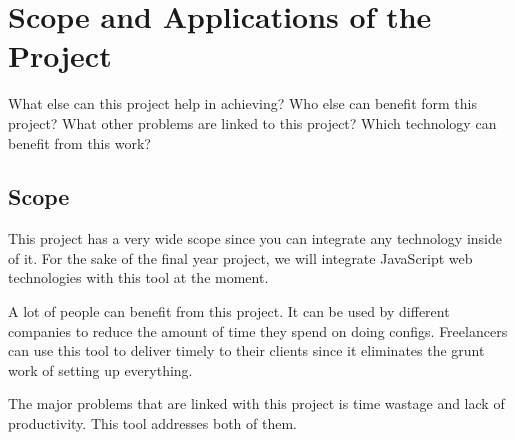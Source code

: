 \section{Scope and Applications of the Project}
What else can this project help in achieving? Who else can benefit form this project? What other problems are linked to this project? Which technology can benefit from this work?

\subsection{Scope}
This project has a very wide scope since you can integrate any technology inside of it. For the sake of the final year project, we will integrate JavaScript web technologies with this tool at the moment.

A lot of people can benefit from this project. It can be used by different companies to reduce the amount of time they spend on doing configs. Freelancers can use this tool to deliver timely to their clients since it eliminates the grunt work of setting up everything.

The major problems that are linked with this project is time wastage and lack of productivity. This tool addresses both of them.


